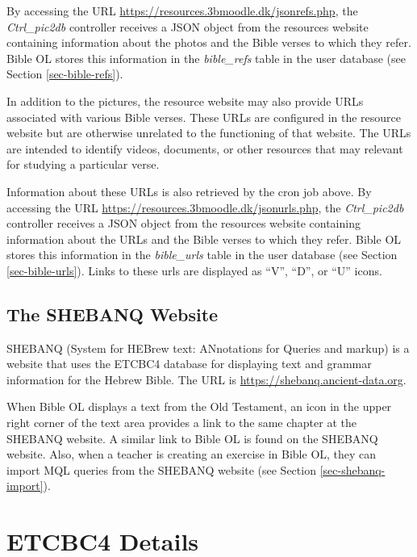 \documentclass[11pt,oneside,a4paper]{memoir}
\begin{document}
By accessing the URL \url{https://resources.3bmoodle.dk/jsonrefs.php}, the \emph{Ctrl\_pic2db}
controller receives a JSON object from the resources website containing information about the photos
and the Bible verses to which they refer. Bible OL stores this information in the
\emph{bible\_refs} table in the user database (see Section
\ref{sec-bible-refs}).

In addition to the pictures, the resource website may also provide URLs associated with various
Bible verses. These URLs are configured in the resource website but are otherwise unrelated to the
functioning of that website. The URLs are intended to identify videos, documents, or other resources
that may relevant for studying a particular verse.

Information about these URLs is also retrieved by the cron job above. By accessing the URL
\url{https://resources.3bmoodle.dk/jsonurls.php}, the \emph{Ctrl\_pic2db} controller receives a JSON
object from the resources website containing information about the URLs and the Bible verses to
which they refer. Bible OL stores this information in the \emph{bible\_urls}%
table in the user database (see Section \ref{sec-bible-urls}). Links to these
urls are displayed as ``V'', ``D'', or ``U'' icons.

\section{The SHEBANQ Website}\label{sec-shebanq}

SHEBANQ (System for HEBrew text: ANnotations for Queries and markup) is a website that uses the
ETCBC4 database for displaying text and grammar information for the Hebrew Bible. The URL is
\url{https://shebanq.ancient-data.org}.

When Bible OL displays a text from the Old Testament, an icon in the upper right corner of the text
area provides a link to the same chapter at the SHEBANQ website. A similar link to Bible OL is found
on the SHEBANQ website. Also, when a teacher is creating an exercise in Bible OL, they can import
MQL queries from the SHEBANQ website (see Section \ref{sec-shebanq-import}).


\appendix
\chapter{ETCBC4 Details}\label{app-etcbc}
\end{document}
